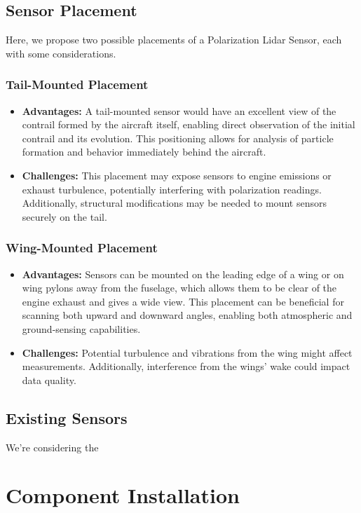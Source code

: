 \documentclass[a4paper, 12pt]{report}
\begin{document}
\section{Sensor Placement}
Here, we propose two possible placements of a Polarization Lidar Sensor, each with some considerations.
\subsection{Tail-Mounted Placement}
\begin{itemize}
    \item \textbf{Advantages:} A tail-mounted sensor would have an excellent view of the contrail formed by the aircraft itself, enabling direct observation of the initial contrail and its evolution. This positioning allows for analysis of particle formation and behavior immediately behind the aircraft.
    \item \textbf{Challenges:} This placement may expose sensors to engine emissions or exhaust turbulence, potentially interfering with polarization readings. Additionally, structural modifications may be needed to mount sensors securely on the tail.
\end{itemize}

\subsection{Wing-Mounted Placement}
\begin{itemize}
    \item \textbf{Advantages:} Sensors can be mounted on the leading edge of a wing or on wing pylons away from the fuselage, which allows them to be clear of the engine exhaust and gives a wide view. This placement can be beneficial for scanning both upward and downward angles, enabling both atmospheric and ground-sensing capabilities.
    \item \textbf{Challenges:} Potential turbulence and vibrations from the wing might affect measurements. Additionally, interference from the wings' wake could impact data quality.
\end{itemize}






\section{Existing Sensors}
We're considering the  
\chapter{Component Installation}
\end{document}
